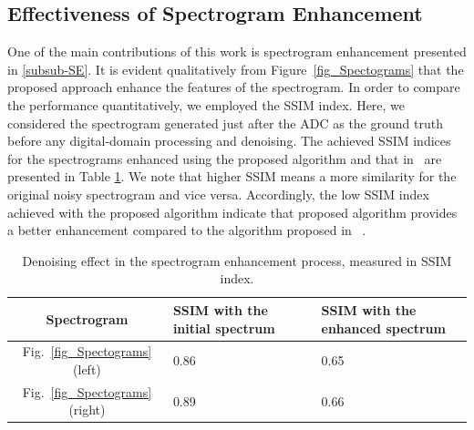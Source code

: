 \documentclass[applsci,article,accept,moreauthors,pdftex]{Definitions/mdpi}
\begin{document}
\subsection{Effectiveness of Spectrogram Enhancement}
One of the main contributions of this work is spectrogram enhancement presented in \ref{subsub-SE}. It is evident qualitatively from Figure~\ref{fig_Spectograms} that the proposed approach enhance the features of the spectrogram. In order to compare the performance quantitatively, we employed the SSIM index. Here, we considered the spectrogram generated just after the ADC as the ground truth before any digital-domain processing and denoising. The achieved SSIM indices for the spectrograms enhanced using the proposed algorithm and that in~\cite{zeppelzauer2015towards} are presented in Table \ref{tab_denoise}. We note that higher SSIM means a more similarity for the original noisy spectrogram and vice versa. Accordingly, the low SSIM index achieved with the proposed algorithm indicate that proposed algorithm provides a better enhancement compared to the algorithm proposed in ~\cite{zeppelzauer2015towards}. 
\begin{table}[t!]
	\centering
	\begin{tabular}{|c|p{3cm}|p{3cm}|}
		\hline
		\textbf{Spectrogram} & \textbf{SSIM with the initial spectrum~\cite{zeppelzauer2015towards}} & \textbf{SSIM with the enhanced spectrum} \\
		\hline
		Fig.~\ref{fig_Spectograms}(left) & 0.86 &0.65\\
		\hline
		Fig.~\ref{fig_Spectograms}(right)& 0.89 & 0.66 \\
		\hline
	\end{tabular}
	\caption{Denoising effect in the spectrogram enhancement process, measured in SSIM index.}
	\label{tab_denoise}
\end{table}
\end{document}
